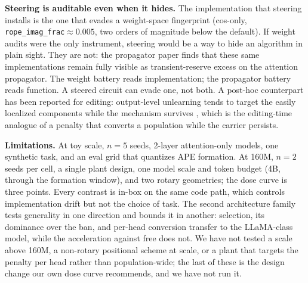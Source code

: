 \documentclass[11pt]{article}
\newcommand{\rif}{\texttt{rope\_imag\_frac}\xspace}
\begin{document}
\textbf{Steering is auditable even when it hides.} The implementation that steering installs is the one that
evades a weight-space fingerprint (cos-only, \rif${\approx}0.005$, two orders of magnitude below the default). If
weight audits were the only instrument, steering would be a way to hide an algorithm in plain sight. They are not:
the propagator paper \citep{li2026pseudospectra} finds that these same implementations remain fully
visible as transient-reserve excess on the attention propagator. The weight battery reads implementation;
the propagator battery reads function. A steered circuit can evade one, not both. A post-hoc counterpart has been
reported for editing: output-level unlearning tends to target the easily localized components while the mechanism
survives \citep{guo2024mechanistic}, which is the editing-time analogue of a penalty that converts a population
while the carrier persists.

\textbf{Limitations.} At toy scale, $n{=}5$ seeds, 2-layer attention-only models, one synthetic task, and an
eval grid that quantizes APE formation. At 160M, $n{=}2$ seeds per cell, a single plant design, one model scale
and token budget (4B, through the formation window), and two rotary geometries; the dose curve is three points.
Every contrast is in-box on the same code path, which controls implementation drift but not the choice of task.
The second architecture family tests generality in one direction and bounds it in another: selection, its
dominance over the ban, and per-head conversion transfer to the LLaMA-class model, while the acceleration against
free does not. We have not tested a scale above 160M, a non-rotary positional scheme at scale, or a plant that
targets the penalty per head rather than population-wide; the last of these is the design change our own dose
curve recommends, and we have not run it.
\end{document}

